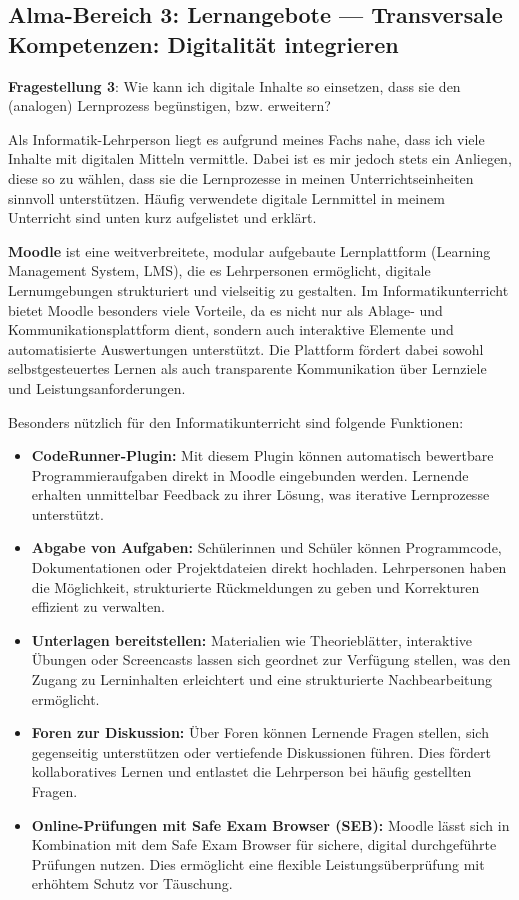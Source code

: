 \subsection{Alma-Bereich 3: Lernangebote --- Transversale Kompetenzen: Digitalität integrieren}
\textbf{Fragestellung 3}: Wie kann ich digitale Inhalte so einsetzen, dass sie den (analogen) Lernprozess begünstigen, bzw. erweitern?

Als Informatik-Lehrperson liegt es aufgrund meines Fachs nahe, dass ich viele Inhalte mit digitalen Mitteln vermittle. Dabei ist es mir jedoch stets ein Anliegen, diese so zu wählen, dass sie die Lernprozesse in meinen Unterrichtseinheiten sinnvoll unterstützen. Häufig verwendete digitale Lernmittel in meinem Unterricht sind unten kurz aufgelistet und erklärt.

\textbf{Moodle }ist eine weitverbreitete, modular aufgebaute Lernplattform (Learning Management System, LMS), die es Lehrpersonen ermöglicht, digitale Lernumgebungen strukturiert und vielseitig zu gestalten. Im Informatikunterricht bietet Moodle besonders viele Vorteile, da es nicht nur als Ablage- und Kommunikationsplattform dient, sondern auch interaktive Elemente und automatisierte Auswertungen unterstützt. Die Plattform fördert dabei sowohl selbstgesteuertes Lernen als auch transparente Kommunikation über Lernziele und Leistungsanforderungen. 

Besonders nützlich für den Informatikunterricht sind folgende Funktionen:

\begin{itemize}
  \item \textbf{CodeRunner-Plugin:} Mit diesem Plugin können automatisch bewertbare Programmieraufgaben direkt in Moodle eingebunden werden. Lernende erhalten unmittelbar Feedback zu ihrer Lösung, was iterative Lernprozesse unterstützt.
  \item \textbf{Abgabe von Aufgaben:} Schülerinnen und Schüler können Programmcode, Dokumentationen oder Projektdateien direkt hochladen. Lehrpersonen haben die Möglichkeit, strukturierte Rückmeldungen zu geben und Korrekturen effizient zu verwalten.
  \item \textbf{Unterlagen bereitstellen:} Materialien wie Theorieblätter, interaktive Übungen oder Screencasts lassen sich geordnet zur Verfügung stellen, was den Zugang zu Lerninhalten erleichtert und eine strukturierte Nachbearbeitung ermöglicht.
  \item \textbf{Foren zur Diskussion:} Über Foren können Lernende Fragen stellen, sich gegenseitig unterstützen oder vertiefende Diskussionen führen. Dies fördert kollaboratives Lernen und entlastet die Lehrperson bei häufig gestellten Fragen.
  \item \textbf{Online-Prüfungen mit Safe Exam Browser (SEB):} Moodle lässt sich in Kombination mit dem Safe Exam Browser für sichere, digital durchgeführte Prüfungen nutzen. Dies ermöglicht eine flexible Leistungsüberprüfung mit erhöhtem Schutz vor Täuschung.
\end{itemize}

